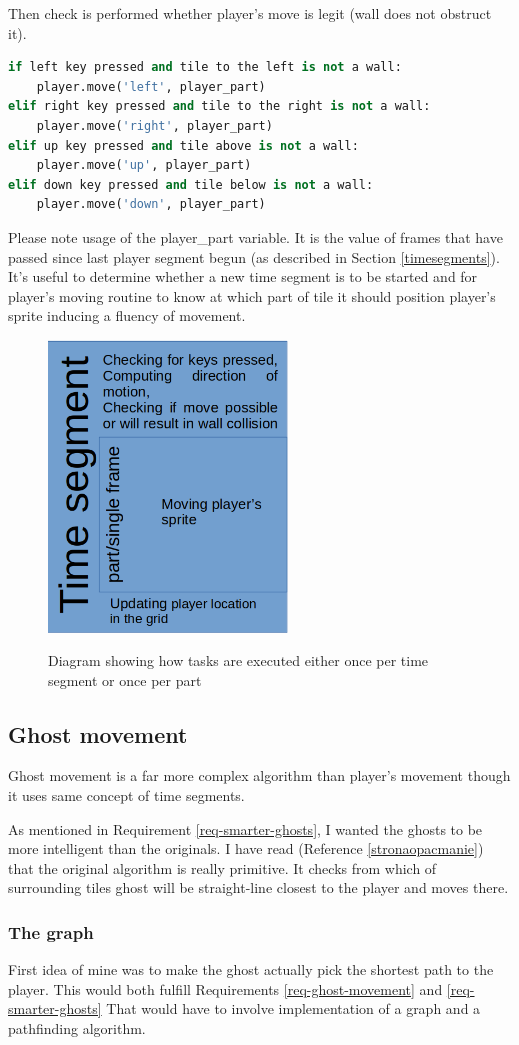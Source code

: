 \documentclass[11pt,a4paper]{report}
\newcommand{\dsubsection}[1]{\FloatBarrier \subsection{#1}}
\newenvironment{img}{
	\begin{center}
		\begin{figure}[H]
			\begin{center}
			
}{
	\end{center}
		\end{figure}
			\end{center}
}
\begin{document}
				Then check is performed whether player's move is legit (wall does not obstruct it).
				\begin{lstlisting}[language=Python]
if left key pressed and tile to the left is not a wall:
	player.move('left', player_part)
elif right key pressed and tile to the right is not a wall:
	player.move('right', player_part)
elif up key pressed and tile above is not a wall:
	player.move('up', player_part)
elif down key pressed and tile below is not a wall:
	player.move('down', player_part)
				\end{lstlisting}
				Please note usage of the player\_part variable. It is the value of frames that have passed since last player segment begun (as described in Section \ref{timesegments}). It's useful to determine whether a new time segment is to be started and for player's moving routine to know at which part of tile it should position player's sprite inducing a fluency of movement.
				\begin{img}
					\includegraphics[width=180pt]{images/movement-diagram}\\
					\caption{Diagram showing how tasks are executed either once per time segment or once per part}
					\label{player-TS}
				\end{img}
			\dsubsection{Ghost movement}
				\label{ghost-movement}
				Ghost movement is a far more complex algorithm than player's movement though it uses same concept of time segments.
				
				As mentioned in Requirement \ref{req-smarter-ghosts}, I wanted the ghosts to be more intelligent than the originals. I have read (Reference \ref{stronaopacmanie}) that the original algorithm is really primitive. It checks from which of surrounding tiles ghost will be straight-line closest to the player and moves there.
				\subsubsection{The graph}
					First idea of mine was to make the ghost actually pick the shortest path to the player. This would both fulfill Requirements \ref{req-ghost-movement} and \ref{req-smarter-ghosts} That would have to involve implementation of a graph and a pathfinding algorithm.
					
\end{document}
